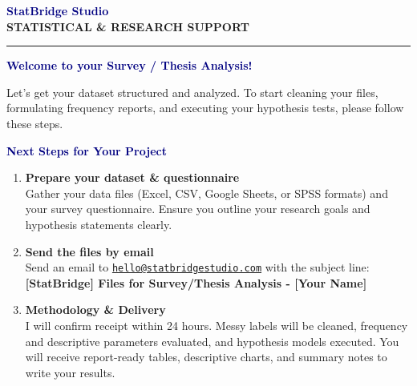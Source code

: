 \documentclass[11pt,a4paper]{article}
\begin{document}
\begin{center}
    {\Huge \bfseries \textcolor{navy}{StatBridge Studio}} \\[0.25em]
    {\small \bfseries \textcolor{amber}{STATISTICAL \& RESEARCH SUPPORT}} \\
    \rule{\linewidth}{1.5pt}
\end{center}

\vspace{2em}

{\LARGE \bfseries \textcolor{navy}{Welcome to your Survey / Thesis Analysis!}}

Let's get your dataset structured and analyzed. To start cleaning your files, formulating frequency reports, and executing your hypothesis tests, please follow these steps.

\vspace{1.5em}

\noindent\makebox[\linewidth]{\rule{\textwidth}{0.8pt}}
\vspace{-0.5em}
\begin{center}
\begin{minipage}{0.95\textwidth}
    {\large \bfseries \textcolor{navy}{Next Steps for Your Project}}
    \begin{enumerate}[label=\textbf{\color{royalblue}\arabic*.}, leftmargin=1.5em]
        \item \textbf{Prepare your dataset \& questionnaire} \\
        Gather your data files (Excel, CSV, Google Sheets, or SPSS formats) and your survey questionnaire. Ensure you outline your research goals and hypothesis statements clearly.
        
        \item \textbf{Send the files by email} \\
        Send an email to \href{mailto:hello@statbridgestudio.com}{\texttt{hello@statbridgestudio.com}} with the subject line: \\
        \textbf{[StatBridge] Files for Survey/Thesis Analysis - [Your Name]}
        
        \item \textbf{Methodology \& Delivery} \\
        I will confirm receipt within 24 hours. Messy labels will be cleaned, frequency and descriptive parameters evaluated, and hypothesis models executed. You will receive report-ready tables, descriptive charts, and summary notes to write your results.
    \end{enumerate}
\end{minipage}
\end{center}
\noindent\makebox[\linewidth]{\rule{\textwidth}{0.8pt}}
\end{document}

